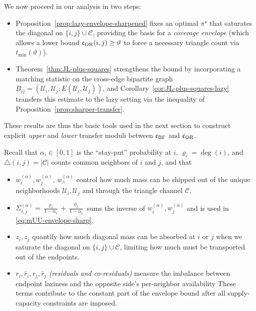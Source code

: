 \documentclass[twoside,11pt]{article}
\numberwithin{equation}{section}
\numberwithin{theorem}{section}
\numberwithin{example}{section}
\begin{document}
We now proceed in our analysis in two steps:
\begin{itemize}
\item[(i)] Proposition~\ref{prop:lazy-envelope-sharpened} fixes an optimal $\pi^\star$ that saturates the diagonal on $\{i,j\}\cup\mathcal C$, providing the basis for a \emph{coverage envelope} (which allows a lower bound $\mathfrak c_{\rm OR}(i,j)\ge \vartheta$ to force a necessary triangle count via $t_{\min}(\vartheta)$).

\item[(ii)] Theorem~\ref{thm:JL-plus-squares} strengthens the \citeauthor{jost_clustering_2014} bound by incorporating a matching statistic on the cross-edge bipartite graph $B_{ij}=(\mathcal U_i,\mathcal U_j;E(\mathcal U_i,\mathcal U_j))$, and Corollary~\ref{cor:JL-plus-squares-lazy} transfers this estimate to the lazy setting via the inequality of Proposition~\ref{prop:sharper-transfer}.
\end{itemize}
These results are thus the basic tools used in the next section to construct explicit \emph{upper} and \emph{lower} transfer moduli between $\mathfrak c_{\rm BF}$ and $\mathfrak c_{\rm OR}$. 

Recall that $\alpha_i\in[0,1]$ is the ``stay-put'' probability at $i$, 
$\varrho_i=\deg(i)$, and $\triangle(i,j)=|\mathcal C|$ counts common neighbors of $i$ and $j$, and that
\begin{itemize}
\item[{\rm (a)}] $w^{(\alpha)}_i,w^{(\alpha)}_j$, $w^{(\alpha)}_\wedge$ control how much mass can be shipped out of the unique neighborhoods $\mathcal U_i,\mathcal U_j$ and through the triangle channel $\mathcal C$.


\item[{\rm(b)}] $\displaystyle\Sigma^{(\alpha)}_{i,j}=\frac{\varrho_i}{1-\alpha_i}+\frac{\varrho_j}{1-\alpha_j}$ sums the inverse  of $w^{(\alpha)}_i,w^{(\alpha)}_j$ and is used in \eqref{eq:mUU-envelope-sharp}.


\item[{\rm(c)}] $z_i,z_j$ quantify how much diagonal mass can be absorbed at $i$ or $j$ when we saturate
the diagonal on $\{i,j\}\cup\mathcal C$, limiting how much must be transported out of the endpoints.
\item[{\rm(d)}] $r_i,\bar r_i,r_j,\bar r_j$ \emph{(residuals and co-residuals)} measure the imbalance between endpoint laziness and the
opposite side’s per-neighbor availability 
These terms contribute to the constant part of the envelope bound after all supply-capacity constraints are imposed.
\end{itemize}
\end{document}
